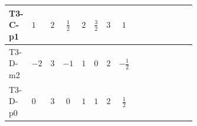 \documentclass[8pt]{article}
\begin{document}
\begin{landscape}
\begin{longtable}{@{}llcccccc >{\raggedright\arraybackslash}p{0.21\linewidth} >{\raggedright\arraybackslash}p{0.21\linewidth} >{\raggedright\arraybackslash}p{0.21\linewidth}@{}}
T3-C-p1 & $1$ & $2$ & $\frac{1}{2}$ & $2$ & $\frac{3}{2}$ & $3$ & $1$ & \scriptsize\adjustbox{max width=\linewidth}{$\begin{gathered} -\frac{3}{2} (\left({Y_d}\,\left({Y_d}\right)^{\dagger}\,{Y_u}\right)_{ij}-\left({Y_u}\,\left({Y_u}\right)^{\dagger}\,{Y_u}\right)_{ij})\end{gathered}$} & \scriptsize\adjustbox{max width=\linewidth}{$\begin{gathered} -\frac{9}{4} {g_2}^2 \left({Y_u}\right)_{ij}\end{gathered}$} & \scriptsize\adjustbox{max width=\linewidth}{$\begin{gathered} -8 {g_3}^2 \left({Y_u}\right)_{ij}\end{gathered}$} \\
\midrule
T3-D-m2 & $-2$ & $3$ & $-1$ & $1$ & $0$ & $2$ & $-\frac{1}{2}$ & \scriptsize\adjustbox{max width=\linewidth}{$\begin{gathered} -\frac{3}{2} (\left({Y_d}\,\left({Y_d}\right)^{\dagger}\,{Y_u}\right)_{ij}-\left({Y_u}\,\left({Y_u}\right)^{\dagger}\,{Y_u}\right)_{ij})\end{gathered}$} & \scriptsize\adjustbox{max width=\linewidth}{$\begin{gathered} -\frac{9}{4} {g_2}^2 \left({Y_u}\right)_{ij}\end{gathered}$} & \scriptsize\adjustbox{max width=\linewidth}{$\begin{gathered} -8 {g_3}^2 \left({Y_u}\right)_{ij}\end{gathered}$} \\
\midrule
T3-D-p0 & $0$ & $3$ & $0$ & $1$ & $1$ & $2$ & $\frac{1}{2}$ & \scriptsize\adjustbox{max width=\linewidth}{$\begin{gathered} -\frac{3}{2} (\left({Y_d}\,\left({Y_d}\right)^{\dagger}\,{Y_u}\right)_{ij}-\left({Y_u}\,\left({Y_u}\right)^{\dagger}\,{Y_u}\right)_{ij})\end{gathered}$} & \scriptsize\adjustbox{max width=\linewidth}{$\begin{gathered} -\frac{9}{4} {g_2}^2 \left({Y_u}\right)_{ij}\end{gathered}$} & \scriptsize\adjustbox{max width=\linewidth}{$\begin{gathered} -8 {g_3}^2 \left({Y_u}\right)_{ij}\end{gathered}$} \\
\midrule

\end{longtable}
\end{landscape}
\end{document}
